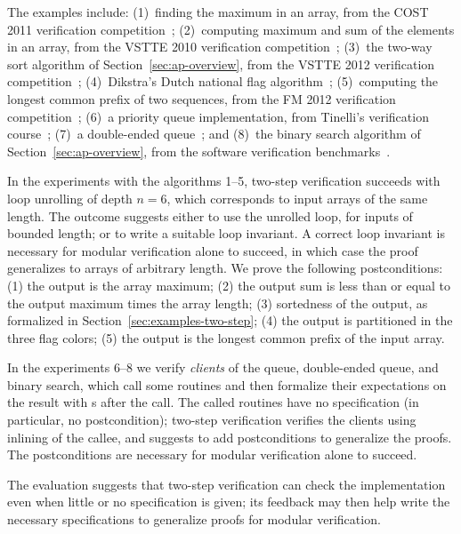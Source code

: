 The examples include: 
(1)~finding the maximum in an array, from the COST 2011 verification competition~\cite{BORMER11};
(2)~computing maximum and sum of the elements in an array, from the VSTTE 2010 verification competition~\cite{KLEBANOV11};
(3)~the two-way sort algorithm of Section~\ref{sec:ap-overview}, from the VSTTE 2012 verification competition~\cite{FILLIATRE12};
(4)~Dikstra's Dutch national flag algorithm~\cite{DIJKSTRA76};
(5)~computing the longest common prefix of two sequences, from the FM 2012 verification competition~\cite{HUISMAN12};
(6)~a priority queue implementation, from Tinelli's verification course~\cite{TINELLI2011}; 
(7)~a double-ended queue~\cite[Vol.~1, Sec.~2.2.1]{KNUTH11}; and
(8)~the binary search algorithm of Section~\ref{sec:ap-overview}, from the software verification benchmarks~\cite{VSI08}. 




In the experiments with the algorithms 1--5, two-step verification succeeds with loop unrolling of depth $n=6$, which corresponds to input arrays of the same length.
The outcome suggests either to use the unrolled loop, for inputs of bounded length; or to write a suitable loop invariant.
A correct loop invariant is necessary for modular verification alone to succeed, in which case the proof generalizes to arrays of arbitrary length.
We prove the following postconditions: (1) the output is the array maximum; (2) the output sum is less than or equal to the output maximum times the array length; (3) sortedness of the output, as formalized in Section~\ref{sec:examples-two-step}; (4) the output is partitioned in the three flag colors; (5) the output is the longest common prefix of the input array.



In the experiments 6--8 we verify \emph{clients} of the queue, double-ended queue, and binary search, which call some routines and then formalize their expectations on the result with s after the call.
The called routines have no specification (in particular, no postcondition); two-step verification verifies the clients using inlining of the callee, and suggests to add postconditions to generalize the proofs.
The postconditions are necessary for modular verification alone to succeed.

The evaluation suggests that two-step verification can check the implementation even when little or no specification is given; its feedback may then help write the necessary specifications to generalize proofs for modular verification.


